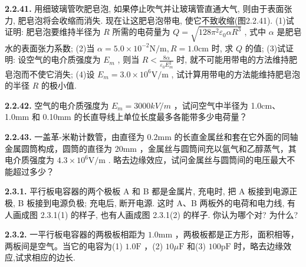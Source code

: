 \vfill
\newpage

\textbf{2.2.41.} 用细玻璃管吹肥皂泡, 如果停止吹气并让玻璃管直通大气, 则由于表面张力, 肥皂泡将会收缩而消失. 现在让这肥皂泡带电, 使它不致收缩(图2.2.41). (1)试证明: 肥皂泡要维持半径为 $R$ 所需的电荷量为 $Q = \sqrt{128\pi^2\varepsilon_0\alpha R^3}$ , 式中 $\alpha$ 是肥皂水的表面张力系数; (2)当 $\alpha = 5.0\times 10^{-2}\mathrm{N / m}, R = 1.0\mathrm{cm}$ 时, 求 $Q$ 的值; (3)试证明: 设空气的电介质强度为 $E_{m}$ , 则当 $\displaystyle R < \frac{8\alpha}{\varepsilon_0E_m^2}$ 时, 就不可能用带电的方法维持肥皂泡而不使它消失; (4)设 $E_{m} = 3.0\times 10^{6}\mathrm{V / m}$ , 试计算用带电的方法能维持肥皂泡的半径 $R$ 的极小值.

\begin{center}
\end{center}

\vfill
\newpage

\textbf{2.2.42.} 空气的电介质强度为 $E_{m}=3000kV/m$ ，试问空气中半径为 1.0cm、1.0mm 和 0.10mm 的长直导线上单位长度最多各能带多少电荷量？

\vfill
\newpage

\textbf{2.2.43.} 一盖革-米勒计数管，由直径为 $0.2\mathrm{mm}$ 的长直金属丝和套在它外面的同轴金属圆筒构成，圆筒的直径为 $20\mathrm{mm}$ ，金属丝与圆筒间充以氩气和乙醇蒸气，其电介质强度为 $4.3 \times 10^{6}\mathrm{V / m}$ . 略去边缘效应，试问金属丝与圆筒间的电压最大不能超过多少？

\vfill
\newpage

\textbf{2.3.1.} 平行板电容器的两个极板 A 和 B 都是金属片, 充电时, 把 A 板接到电源正极, B 板接到电源负极; 充电后, 断开电源. 这时 A、B 两板外的电荷和电力线, 有人画成图 2.3.1(1) 的样子, 也有人画成图 2.3.1(2) 的样子. 你认为哪个对? 为什么?

\begin{center}
  \begin{minipage}[b]{0.47\linewidth}
    \centering
  \end{minipage}\hfill
  \begin{minipage}[b]{0.47\linewidth}
    \centering
  \end{minipage}
\end{center}

\vfill
\newpage

\textbf{2.3.2.} 一平行板电容器的两极板相距为 $1.0\mathrm{mm}$ ，两极板都是正方形，面积相等，两板间是空气。当它的电容为(1) $1.0\mathrm{F}$ ，(2) $10\mu \mathrm{F}$ 和(3) $100\mathrm{pF}$ 时，略去边缘效应,试求相应的边长.

